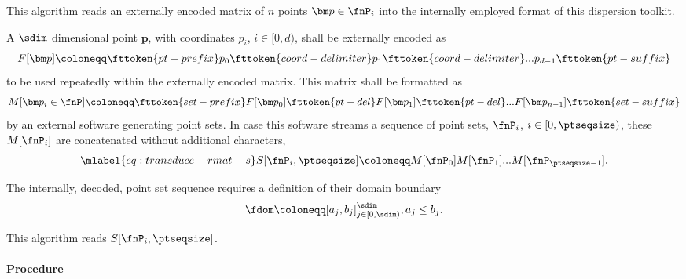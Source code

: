 %
This algorithm reads an externally encoded matrix of $n$ points $\bm p \in \fnP_i$ into the internally employed format of this dispersion toolkit.

A $\sdim$ dimensional point $\bm p$, with coordinates $p_i$, $i \in [0,d)$, shall be externally encoded as
\begin{align*}
  F[\bm p] \coloneqq \fttoken{pt-prefix}p_0\fttoken{coord-delimiter}p_1\fttoken{coord-delimiter}...p_{d-1}\fttoken{pt-suffix}
\end{align*}
to be used repeatedly within the externally encoded matrix. This matrix shall be formatted as
\begin{align*}
  M[\bm p_i \in \fnP] \coloneqq \fttoken{set-prefix}F[\bm p_0]\fttoken{pt-del}F[\bm p_1]\fttoken{pt-del}...F[\bm p_{n-1}]\fttoken{set-suffix}
\end{align*}
by an external software generating point sets. In case this software streams a sequence of point sets, $\fnP_i$, $i \in [0,\ptseqsize)$, these $M[\fnP_i]$ are concatenated without additional characters,
\begin{align}\mlabel{eq:transduce-rmat-s}
  S[\fnP_i, \ptseqsize] \coloneqq M[\fnP_0]M[\fnP_1]...M[\fnP_{\ptseqsize-1}].
\end{align}

The internally, decoded, point set sequence requires a definition of their domain boundary
\begin{align*}
  \fdom \coloneqq [a_j, b_j]^{\sdim}_{j \in [0,\sdim)}, a_j \leq b_j.
\end{align*}

This algorithm reads $S[\fnP_i, \ptseqsize]$.

\paragraph{Procedure}

\begin{synopsis}
\end{synopsis}

